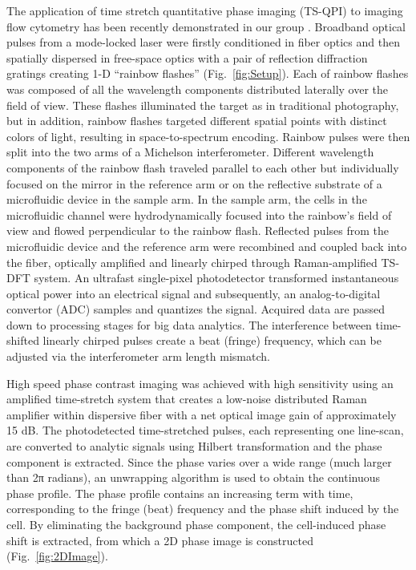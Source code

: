 \documentclass[aps,pra,preprint,superscriptaddress]{revtex4-1}
\begin{document}
The application of time stretch quantitative phase imaging (TS-QPI) to imaging flow cytometry has been recently demonstrated in our group \cite{mahjoubfar2013label}. Broadband optical pulses from a mode-locked laser were firstly conditioned in fiber optics and then spatially dispersed in free-space optics with a pair of reflection diffraction gratings creating 1-D “rainbow flashes” (Fig.~\ref{fig:Setup}). Each of rainbow flashes was composed of all the wavelength components distributed laterally over the field of view. These flashes illuminated the target as in traditional photography, but in addition, rainbow flashes targeted different spatial points with distinct colors of light, resulting in space-to-spectrum encoding. Rainbow pulses were then split into the two arms of a Michelson interferometer. Different wavelength components of the rainbow flash traveled parallel to each other but individually focused on the mirror in the reference arm or on the reflective substrate of a microfluidic device in the sample arm. In the sample arm, the cells in the microfluidic channel were hydrodynamically focused \cite{knight1998hydrodynamic,lee2006hydrodynamic} into the rainbow’s field of view and flowed perpendicular to the rainbow flash. Reflected pulses from the microfluidic device and the reference arm were recombined and coupled back into the fiber, optically amplified and linearly chirped through Raman-amplified TS-DFT system. An ultrafast single-pixel photodetector  transformed instantaneous optical power into an electrical signal and subsequently, an analog-to-digital convertor (ADC) samples and quantizes the signal. Acquired data are passed down to processing stages for big data analytics. The interference between time-shifted linearly chirped pulses create a beat (fringe) frequency, which can be adjusted via the interferometer arm length mismatch.

High speed phase contrast imaging was achieved with high sensitivity using an amplified time-stretch system that creates a low-noise distributed Raman amplifier within dispersive fiber with a net optical image gain of approximately 15 dB. The photodetected time-stretched pulses, each representing one line-scan, are converted to analytic signals using Hilbert transformation \cite{king2009hilbert} and the phase component is extracted. Since the phase varies over a wide range (much larger than 2π radians), an unwrapping algorithm is used to obtain the continuous phase profile. The phase profile contains an increasing term with time, corresponding to the fringe (beat) frequency and the phase shift induced by the cell. By eliminating the background phase component, the cell-induced phase shift is extracted, from which a 2D phase image is constructed (Fig.~\ref{fig:2DImage}).
\end{document}
